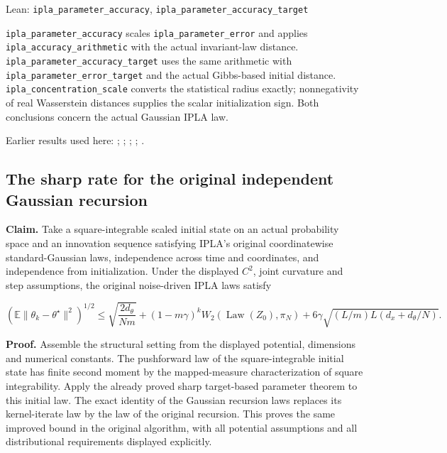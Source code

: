 \documentclass[11pt,a4paper]{report}
\newlength{\leancharwidth}
\newenvironment{leancode}{\par\smallskip\begingroup\ttfamily\footnotesize\raggedright
  \settowidth{\leancharwidth}{M}\setlength{\parskip}{0pt}\setlength{\parindent}{0pt}
  \frenchspacing}{\par\endgroup\smallskip}
\newcommand{\leanlabel}[1]{\par\smallskip\noindent{\small\bfseries #1}\par}
\begin{document}
\begin{leanbox}{Lean: \texttt{ipla\_\allowbreak{}parameter\_\allowbreak{}accuracy}, \texttt{ipla\_\allowbreak{}parameter\_\allowbreak{}accuracy\_\allowbreak{}target}}
\begin{leancode}
\end{leancode}
\leanlabel{How the Lean proof follows the argument}
\texttt{ipla\_\allowbreak{}parameter\_\allowbreak{}accuracy} scales \texttt{ipla\_\allowbreak{}parameter\_\allowbreak{}error} and applies \texttt{ipla\_\allowbreak{}accuracy\_\allowbreak{}arithmetic} with the actual invariant-law distance. \texttt{ipla\_\allowbreak{}parameter\_\allowbreak{}accuracy\_\allowbreak{}target} uses the same arithmetic with \texttt{ipla\_\allowbreak{}parameter\_\allowbreak{}error\_\allowbreak{}target} and the actual Gibbs-based initial distance. \texttt{ipla\_\allowbreak{}concentration\_\allowbreak{}scale} converts the statistical radius exactly; nonnegativity of real Wasserstein distances supplies the scalar initialization sign. Both conclusions concern the actual Gaussian IPLA law.
\end{leanbox}


Earlier results used here: \cite[Section~3.17.4]{LangevinLean2026ULASC}; \cite[Section~3.1.1]{LangevinLean2026IPLA}; \cite[Section~3.1.6]{LangevinLean2026IPLA}; \cite[Section~3.3.1]{LangevinLean2026IPLA}; \cite[Section~3.3.2]{LangevinLean2026IPLA}.
\subsection{\texorpdfstring{The sharp rate for the original independent Gaussian recursion}{The sharp rate for the original independent Gaussian recursion}}
\label{report-step-WassersteinMixing-IPLA-lean-7}


\textbf{Claim.} Take a square-integrable scaled initial state on an actual probability space and an innovation sequence satisfying IPLA's original coordinatewise standard-Gaussian laws, independence across time and coordinates, and independence from initialization. Under the displayed \(C^2\), joint curvature and step assumptions, the original noise-driven IPLA laws satisfy

\[\left(\mathbb E\|\theta_k-\theta^\star\|^2\right)^{1/2}\le\sqrt{\frac{2d_\theta}{Nm}}+(1-m\gamma)^kW_2(\operatorname{Law}(Z_0),\pi_N)+6\gamma\sqrt{(L/m)L(d_x+d_\theta/N)}.\]


\textbf{Proof.} Assemble the structural setting from the displayed potential, dimensions and numerical constants. The pushforward law of the square-integrable initial state has finite second moment by the mapped-measure characterization of square integrability. Apply the already proved sharp target-based parameter theorem to this initial law. The exact identity of the Gaussian recursion laws replaces its kernel-iterate law by the law of the original recursion. This proves the same improved bound in the original algorithm, with all potential assumptions and all distributional requirements displayed explicitly.
\end{document}
